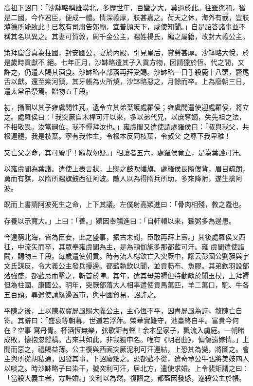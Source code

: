 \begin{pinyinscope}
 高祖下詔曰：「沙缽略稱雄漠北，多歷世年，百蠻之大，莫過於此。往雖與和，猶是二國，今作君臣，便成一體。情深義厚，朕甚嘉之。荷天之休，海外有截，豈朕薄德所能致此！已敕有司肅告郊廟，宜普頒天下，咸使知聞。」自是詔答諸事並不稱其名以異之。其妻可賀敦，周千金公主，賜姓楊氏，編之屬籍，改封大義公主。



 策拜窟含真為柱國，封安國公，宴於內殿，引見皇后，賞勞甚厚。沙缽略大悅，於是歲時貢獻不
 絕。七年正月，沙缽略遣其子入貢方物，因請獵於恆、代之間，又許之，仍遣人賜其酒食。沙缽略率部落再拜受賜。沙缽略一日手殺鹿十八頭，齎尾舌以獻。還至紫河鎮，其牙帳為火所燒，沙缽略惡之，月餘而卒。上為廢朝三日，遣太常吊祭焉。贈物五千段。



 初，攝圖以其子雍虞閭性芃，遺令立其弟葉護處羅侯；雍虞閭遣使迎處羅侯，將立之。處羅侯曰：「我突厥自木桿可汗以來，多以弟代兄，以庶奪嫡，失先祖之法，不相敬畏。汝當嗣位，我不憚拜汝也。」雍虞閭又遣使謂處羅侯曰：「叔與我父，共根連體，我是枝葉。寧有我作主，令根本反同枝葉，令叔父
 之尊下我卑稚！



 又亡父之命，其可廢乎！願叔勿疑。」相讓者五六，處羅侯竟立，是為葉護可汗。



 以雍虞閭為葉護。遣使上表言狀，上賜之鼓吹幡旗。處羅侯長頤僂背，眉目疏朗，勇而有謀，以隋所賜旗鼓西征阿波。敵人以為得隋兵所助，多來降附，遂生擒阿波。



 既而上書請阿波死生之命，上下其議。左僕射高熲進曰：「骨肉相殘，教之蠹也。



 存養以示寬大。」上曰：「善。」熲因奉觴進曰：「自軒轅以來，獯粥多為邊患。



 今遠窮北海，皆為臣妾，此之盛事，振古未聞，臣敢再拜上壽。」其後處羅侯又西征，中流矢而卒，其眾奉雍虞閭為主，是為頡伽施多那都藍可汗。雍
 虞閭遣使詣闕，賜物三千段。每歲遣使朝貢。時有流人楊欽亡入突厥中，謬云彭國公劉昶與宇文氏謀反，令大義公主發兵擾邊。都藍執欽以聞，並貢葧布、魚膠。其弟欽羽設部落強盛，都藍忌而擊之，斬首於陣。其年，遣其母弟褥但特勤獻於闐玉杖，上拜褥但為柱國、康國公。明年，突厥部落大人相率遣使貢馬萬匹，羊二萬口，駝、牛各五百頭。尋遣使請緣邊置市，與中國貿易，詔許之。



 平陳之後，上以陳叔寶屏風賜大義公主，主心恆不平，因書屏風為詩，敘陳亡自寄。其辭曰：「盛衰等朝暮，世道若浮萍。榮華實難守，池臺終自平。富貴今何在？空事
 寫丹青。杯酒恆無樂，弦歌詎有聲！余本皇家子，飄流入虜庭。一朝睹成敗，懷抱忽縱橫。古來共如此，非我獨申名。唯有《明君曲》，偏傷遠嫁情。」上聞而惡之，禮賜益薄。公主復與西面突厥泥利可汗連結，上恐其為變，將圖之。會主與所從胡私通，因發其事，下詔廢黜之。恐都藍不從，遣奇章公牛弘將美妓四人以啖之。時沙缽略子曰染干，號突利可汗，居北方，遣使求婚。上令裴矩謂之曰：「當殺大義主者，方許婚。」突利以為然，復譖之，都藍因發怒，遂殺公主於帳。




\end{pinyinscope}
